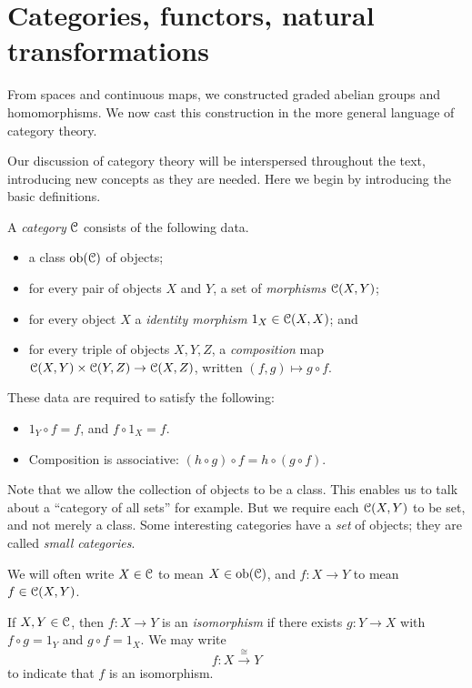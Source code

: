 \section{Categories, functors, natural transformations}\label{categories}
From spaces and continuous maps, we constructed graded abelian groups and homomorphisms. We now cast this construction in the more general language of category theory.

Our discussion of category theory will be interspersed throughout the text, introducing new concepts as they are needed. Here we begin by introducing the basic definitions.

\begin{definition}
A \emph{category} $\mathcal C$ consists of the following data.
\begin{itemize}
\item a class $\mathrm{ob}(\mathcal C)$ of objects;
\item for every pair of objects $X$ and $Y$, a set of \emph{morphisms} 
$\mathcal C(X,Y)$;
\item for every object $X$ a {\em identity morphism} $1_X\in\mathcal C(X,X)$; and
\item for every triple of objects $X,Y,Z$, a {\em composition} map
$\mathcal C(X,Y)\times\mathcal C(Y,Z)\to\mathcal C(X,Z)$, written $(f,g)\mapsto g \circ f$. 
\end{itemize}
These data are required to satisfy the following:
\begin{itemize}
\item $1_Y\circ f=f$, and $f\circ 1_X=f$.
\item Composition is associative: $(h\circ g)\circ f=h\circ(g\circ f)$.
\end{itemize}
\end{definition}
Note that we allow the collection of objects to be a class. This enables us to talk about a ``category of all sets'' for example. But we require each 
$\mathcal C(X,Y)$ to be set, and not merely a class. Some interesting categories have
a {\em set} of objects; they are called {\em small categories}.

We will often write $X\in\mathcal C$ to mean $X\in\mathrm{ob}(\mathcal C)$, and $f\colon X\to Y$ to mean $f\in \mathcal C(X,Y)$.
\begin{definition}
If $X,Y\in \mathcal C$, then $f\colon X\to Y$ is an \emph{isomorphism} if there exists $g\colon Y\to X$ with $f \circ g=1_Y$ and $g\circ f=1_X$. We may write
\[
f:X\xrightarrow{\cong}Y
\]
to indicate that $f$ is an isomorphism. 
\end{definition}

